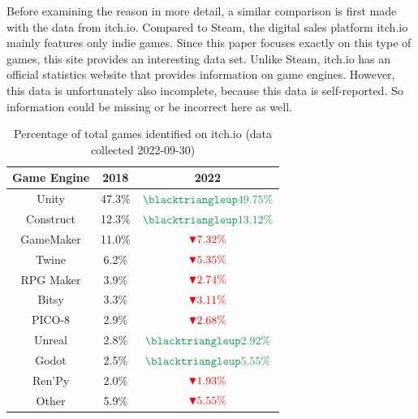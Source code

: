 Before examining the reason in more detail, a similar comparison is first made with the data from itch.io.
Compared to Steam, the digital sales platform itch.io mainly features only indie games.
Since this paper focuses exactly on this type of games, this site provides an interesting data set.
Unlike Steam, itch.io has an official statistics website that provides information on game engines\cite{itchio-engines}.
However, this data is unfortunately also incomplete, because this data is self-reported.
So information could be missing or be incorrect here as well.

\begin{table}[h!]
    \centering
    \begin{tabular}{|c c c|}
        \hline
        Game Engine & 2018   & 2022                                                \\
        \hline\hline
        Unity       & 47.3\% & $\textcolor{ForestGreen}{\blacktriangleup 49.75\%}$ \\
        Construct   & 12.3\% & $\textcolor{ForestGreen}{\blacktriangleup 13.12\%}$ \\
        GameMaker   & 11.0\% & $\textcolor{red}{\blacktriangledown 7.32\%}$        \\
        Twine       & 6.2\%  & $\textcolor{red}{\blacktriangledown 5.35\%}$        \\
        RPG Maker   & 3.9\%  & $\textcolor{red}{\blacktriangledown 2.74\%}$        \\
        Bitsy       & 3.3\%  & $\textcolor{red}{\blacktriangledown 3.11\%}$        \\
        PICO-8      & 2.9\%  & $\textcolor{red}{\blacktriangledown 2.68\%}$        \\
        Unreal      & 2.8\%  & $\textcolor{ForestGreen}{\blacktriangleup 2.92\%}$  \\
        Godot       & 2.5\%  & $\textcolor{ForestGreen}{\blacktriangleup 5.55\%}$  \\
        Ren'Py      & 2.0\%  & $\textcolor{red}{\blacktriangledown 1.93\%}$        \\
        Other       & 5.9\%  & $\textcolor{red}{\blacktriangledown 5.55\%}$        \\
        \hline
    \end{tabular}
    \caption{Percentage of total games identified on itch.io (data collected 2022-09-30)}
    \label{table:itch}
\end{table}

